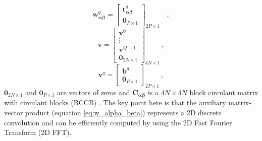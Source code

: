 \begin{equation}
\mathbf{w}_{\boldsymbol{\alpha\beta}}^{q} = \begin{bmatrix}
\mathbf{t}^{q}_{\boldsymbol{\alpha\beta}} \\
\mathbf{0}_{P \times 1}
\end{bmatrix}_{2P \times 1}
\label{eq:wq-vector} \quad ,
\end{equation}
\begin{equation}
\mathbf{v} = \begin{bmatrix}
\mathbf{v}^{0} \\
\vdots \\
\mathbf{v}^{Q - 1} \\
\mathbf{0}_{2N \times 1}
\end{bmatrix}_{4N \times 1} \: ,
\label{eq:v-vector}
\end{equation}
\begin{equation}
\mathbf{v}^{q} = \begin{bmatrix}
\mathbf{b}^{q} \\
\mathbf{0}_{P \times 1}
\end{bmatrix}_{2P \times 1} \: ,
\label{eq:vq-vector} 
\end{equation}
$\mathbf{0}_{2N \times 1}$ and $\mathbf{0}_{P \times 1}$ are vectors of zeros
and $\mathbf{C}_{\boldsymbol{\alpha\beta}}$ is a $4N \times 4N$ 
block circulant matrix with circulant blocks (BCCB) \citep[e.g., ][ p. 184]{davis1979}.
The key point here is that the auxiliary matrix-vector product
(equation \ref{eq:w_alpha_beta}) represents a 2D discrete convolution and can be 
efficiently computed by using the 2D Fast Fourier Transform (2D FFT). 

